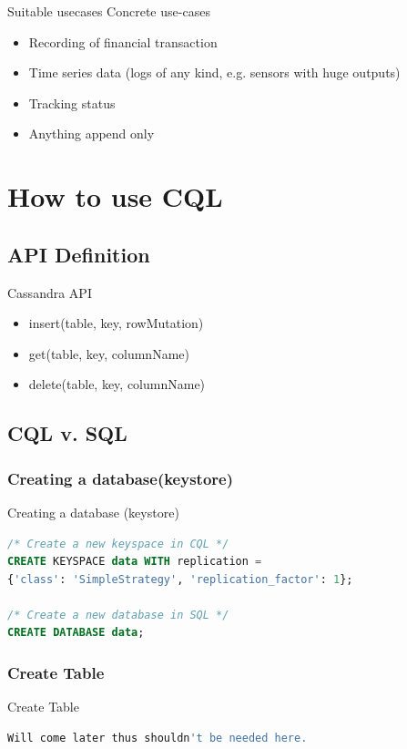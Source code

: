 \documentclass[
  10pt
]{beamer}
\begin{document}
\begin{frame}{Suitable usecases}
  Concrete use-cases
  \begin{itemize}
    \item Recording of financial transaction
    \item Time series data (logs of any kind, e.g. sensors with huge outputs)
    \item Tracking status
    \item Anything append only
  \end{itemize}
\end{frame}

\section{How to use CQL}  %
\subsection{API Definition}
\begin{frame}{Cassandra API}
  \begin{itemize}
    \item insert(table, key, rowMutation)
    \item get(table, key, columnName)
    \item delete(table, key, columnName)
  \end{itemize}
\end{frame}

\subsection{CQL v. SQL}
\subsubsection{Creating a database(keystore)}
\begin{frame}[fragile]{Creating a database (keystore)}
  \begin{lstlisting}[language=SQL]
/* Create a new keyspace in CQL */
CREATE KEYSPACE data WITH replication =
{'class': 'SimpleStrategy', 'replication_factor': 1};

/* Create a new database in SQL */
CREATE DATABASE data;
  \end{lstlisting}
\end{frame}

\subsubsection{Create Table}
\begin{frame}[fragile]{Create Table}
  \begin{lstlisting}[language=SQL]
  Will come later thus shouldn't be needed here.
  \end{lstlisting}
\end{frame}
\end{document}
